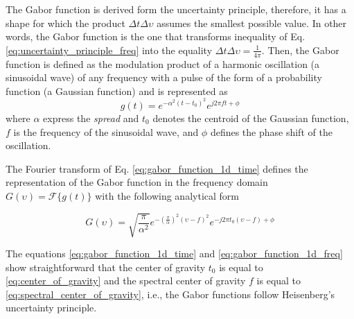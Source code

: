 \documentclass[journal]{IEEEtran}
\begin{document}
The Gabor function is derived form the uncertainty principle, therefore, it has a shape for which the product $\Delta t \Delta \upsilon$ assumes the smallest possible value. In other words, the Gabor function is the one that transforms inequality of Eq. \eqref{eq:uncertainty_principle_freq} into the equality $\Delta t \Delta \upsilon = \frac{1}{4 \pi}$. Then, the Gabor function is defined as the modulation product of a harmonic oscillation (a sinusoidal wave) of any frequency with a pulse of the form of a probability function (a Gaussian function) \cite{Gabor:JIEE:1946} and is represented as
\begin{equation}\label{eq:gabor_function_1d_time}
    g(t) =  e ^{-\alpha^2(t-t_0)^2} e ^{j 2 \pi f t + \phi}
\end{equation}
where $\alpha$ express the \textit{spread} and $t_0$ denotes the centroid of the Gaussian function, $f$ is the frequency of the sinusoidal wave, and $\phi$ defines the phase shift of the oscillation.

The Fourier transform of Eq. \eqref{eq:gabor_function_1d_time} defines the representation of the Gabor function in the frequency domain $G(\upsilon) = \mathcal{F}\{g(t)\}$ with the following analytical form

\begin{equation}\label{eq:gabor_function_1d_freq}
    G(\upsilon) =  \sqrt{\frac{\pi}{\alpha^2}} e ^{-\left(\frac{\pi}{\alpha}\right) ^{2} (\upsilon-f)^2} e ^{-j 2 \pi t_0 (\upsilon-f) + \phi}
\end{equation}

The equations \eqref{eq:gabor_function_1d_time} and \eqref{eq:gabor_function_1d_freq} show straightforward that the center of gravity $t_0$ is equal to \eqref{eq:center_of_gravity} and the spectral center of gravity $f$ is equal to \eqref{eq:spectral_center_of_gravity}, i.e., the Gabor functions follow Heisenberg's uncertainty principle.   
\end{document}
